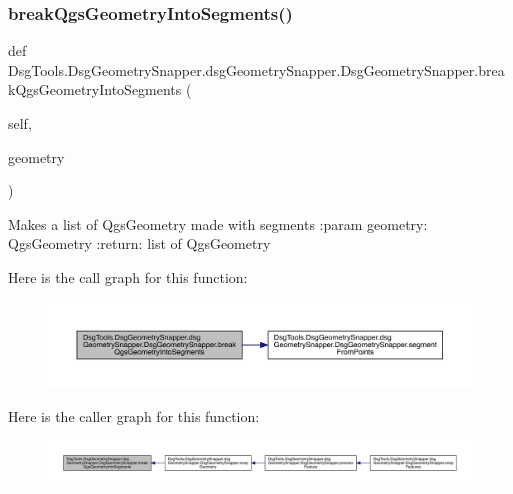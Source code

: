 \subsubsection{\texorpdfstring{break\+Qgs\+Geometry\+Into\+Segments()}{breakQgsGeometryIntoSegments()}}
{\footnotesize\ttfamily def Dsg\+Tools.\+Dsg\+Geometry\+Snapper.\+dsg\+Geometry\+Snapper.\+Dsg\+Geometry\+Snapper.\+break\+Qgs\+Geometry\+Into\+Segments (\begin{DoxyParamCaption}\item[{}]{self,  }\item[{}]{geometry }\end{DoxyParamCaption})}

\begin{DoxyVerb}Makes a list of QgsGeometry made with segments
:param geometry: QgsGeometry
:return: list of QgsGeometry
\end{DoxyVerb}
 Here is the call graph for this function\+:
\nopagebreak
\begin{figure}[H]
\begin{center}
\leavevmode
\includegraphics[width=350pt]{class_dsg_tools_1_1_dsg_geometry_snapper_1_1dsg_geometry_snapper_1_1_dsg_geometry_snapper_a040223ee5660f632af73493c861275d8_cgraph}
\end{center}
\end{figure}
Here is the caller graph for this function\+:
\nopagebreak
\begin{figure}[H]
\begin{center}
\leavevmode
\includegraphics[width=350pt]{class_dsg_tools_1_1_dsg_geometry_snapper_1_1dsg_geometry_snapper_1_1_dsg_geometry_snapper_a040223ee5660f632af73493c861275d8_icgraph}
\end{center}
\end{figure}
\mbox{\label{class_dsg_tools_1_1_dsg_geometry_snapper_1_1dsg_geometry_snapper_1_1_dsg_geometry_snapper_a7e424d4f1b7a44c442de0293124105f8}} 
